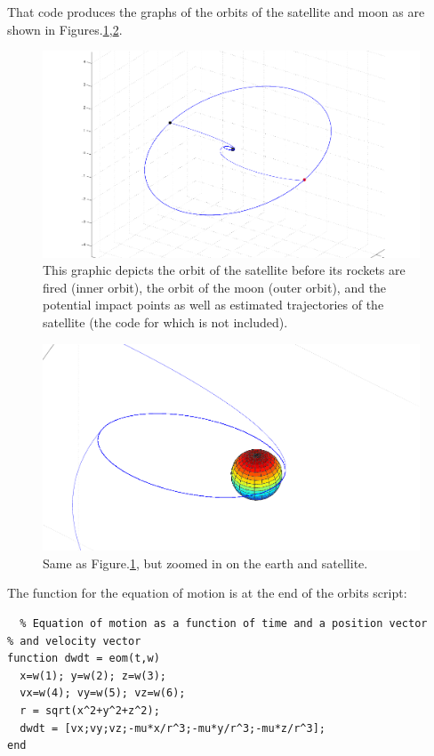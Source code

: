 \documentclass{article}
\begin{document}
\noindent
That code produces the graphs of the orbits of the satellite and moon
as are shown in Figures.\ref{fig:orbits},\ref{fig:satorbit}.

\begin{figure}[H]\centering
  \includegraphics[width=\textwidth]{orbits.png}
  \caption{This graphic depicts the orbit of the satellite before its
    rockets are fired (inner orbit), the orbit of the moon (outer orbit),
    and the potential impact points as well as estimated trajectories of
    the satellite (the code for which is not included).}
  \label{fig:orbits}
\end{figure} 

\begin{figure}[H]\centering
  \includegraphics[width=\textwidth]{satorbit.png}
  \caption{Same as Figure.\ref{fig:orbits}, but zoomed in on the earth
    and satellite.}
  \label{fig:satorbit}
\end{figure} 

\noindent
The function for the equation of motion is at the end of the orbits script:

\begin{verbatim}
  % Equation of motion as a function of time and a position vector
% and velocity vector
function dwdt = eom(t,w)
  x=w(1); y=w(2); z=w(3);
  vx=w(4); vy=w(5); vz=w(6);
  r = sqrt(x^2+y^2+z^2);
  dwdt = [vx;vy;vz;-mu*x/r^3;-mu*y/r^3;-mu*z/r^3];
end
\end{verbatim}
\end{document}
